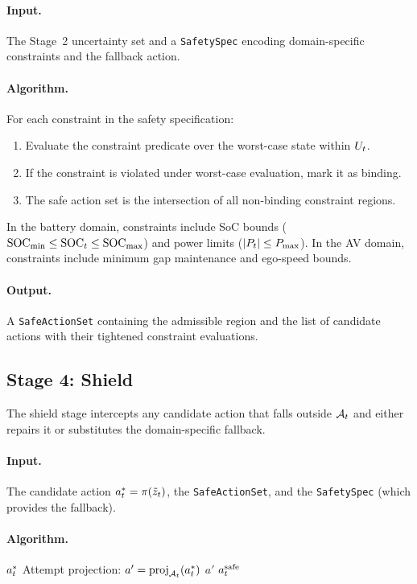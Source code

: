\paragraph{Input.}  The Stage~2 uncertainty set and a
\texttt{SafetySpec} encoding domain-specific constraints and the fallback action.

\paragraph{Algorithm.}  For each constraint in the safety specification:
\begin{enumerate}[nosep]
  \item Evaluate the constraint predicate over the worst-case state within $U_t$.
  \item If the constraint is violated under worst-case evaluation, mark it as
        binding.
  \item The safe action set is the intersection of all non-binding constraint
        regions.
\end{enumerate}

In the battery domain, constraints include SoC bounds ($\mathrm{SOC}_{\min} \le \mathrm{SOC}_t \le
\mathrm{SOC}_{\max}$) and power limits ($|P_t| \le P_{\max}$).  In the AV domain, constraints
include minimum gap maintenance and ego-speed bounds.

\paragraph{Output.}  A \texttt{SafeActionSet} containing the admissible region
and the list of candidate actions with their tightened constraint evaluations.

\subsection{Stage 4: Shield}\label{sec:shield}

The shield stage intercepts any candidate action that falls outside $\mathcal{A}_t$ and
either repairs it or substitutes the domain-specific fallback.

\paragraph{Input.}  The candidate action $a_t^{*} = \pi(\tilde{z}_t)$, the
\texttt{SafeActionSet}, and the \texttt{SafetySpec} (which provides the fallback).

\paragraph{Algorithm.}
\begin{algorithmic}[1]
\If{$\astar \in \Aset$}
  \State \Return $a_t^{*}$ 
\Else
  \State Attempt projection: $a' = \mathrm{proj}_{\mathcal{A}_t}(a_t^{*})$
    \State \Return $a'$ 
  \Else
    \State \Return $a_t^{\mathrm{safe}}$ 
  \EndIf
\EndIf
\end{algorithmic}

